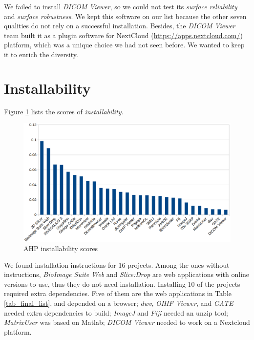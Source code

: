 We failed to install \textit{DICOM Viewer}, so we could not test its \textit{surface reliability} and \textit{surface robustness}. We kept this software on our list because the other seven qualities do not rely on a successful installation. Besides, the \textit{DICOM Viewer} team built it as a plugin software for NextCloud (\hyperlink{https://apps.nextcloud.com/}{https://apps.nextcloud.com/}) platform, which was a unique choice we had not seen before. We wanted to keep it to enrich the diversity.

\section{Installability}
\label{sec_result_installability}

Figure \ref{fg_installability_scores} lists the scores of \textit{installability}.

\begin{figure}[H]
\includegraphics[scale=0.38]{figures/installability_scores.png}
\caption{AHP installability scores}
\label{fg_installability_scores}
\end{figure}

We found installation instructions for 16 projects. Among the ones without instructions, \textit{BioImage Suite Web} and \textit{Slice:Drop} are web applications with online versions to use, thus they do not need installation. Installing 10 of the projects required extra dependencies. Five of them are the web applications in Table \ref{tab_final_list}, and depended on a browser; \textit{dwv}, \textit{OHIF Viewer}, and \textit{GATE} needed extra dependencies to build; \textit{ImageJ} and	\textit{Fiji} needed an unzip tool; \textit{MatrixUser} was based on Matlab; \textit{DICOM Viewer} needed to work on a Nextcloud platform.

